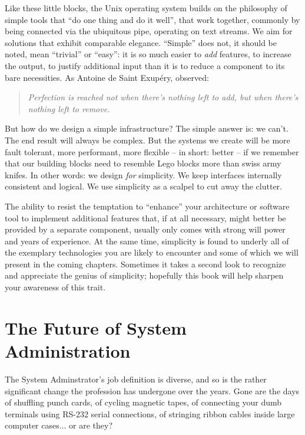Like these little blocks, the Unix operating system
builds on the philosophy of simple tools that ``do one
thing and do it well'', that work together, commonly
by being connected via the ubiquitous pipe,
operating on text
streams\cite{intro:mcilroy-unix-philosophy}.  We aim
for solutions that exhibit comparable elegance.
``Simple'' does not, it should be noted, mean
``trivial'' or ``easy'': it is so much easier to {\em
add} features, to increase the output, to justify
additional input than it is to reduce a component to
its bare necessities.  As Antoine de Saint
Exup\'{e}ry,
observed\cite{intro:exupery:terre-des-hommes}:

\begin{quote}
{\em Perfection is reached not when there's nothing left to
add, but when there's nothing left to remove.}
\end{quote}

But how do we design a simple infrastructure?  The
simple answer is: we can't.  The end result will
always be complex.  But the systems we create will be
more fault tolerant, more performant, more flexible
-- in short: better -- if we remember that our
building blocks need to resemble Lego blocks more than
swiss army knifes.  In other words: we design {\em
for} simplicity.  We keep interfaces internally
consistent and logical.  We use simplicity as a
scalpel to cut away the clutter.

The ability to resist the temptation to ``enhance''
your architecture or software tool to implement
additional features that, if at all necessary, might
better be provided by a separate component, usually
only comes with strong will power and years of
experience.  At the same time, simplicity is found to
underly all of the exemplary technologies you are
likely to encounter and some of which we will present
in the coming chapters.  Sometimes it takes a second
look to recognize and appreciate the genius of
simplicity; hopefully this book will help sharpen your
awareness of this trait.


\section{The Future of System Administration}
\label{introduction:future}

The System Adminstrator's job definition is diverse,
and so is the rather significant change the profession
has undergone over the years.  Gone are the days of
shuffling punch cards, of cycling magnetic tapes, of
connecting your dumb terminals using RS-232 serial
connections, of stringing ribbon cables inside large
computer cases... or are they?

